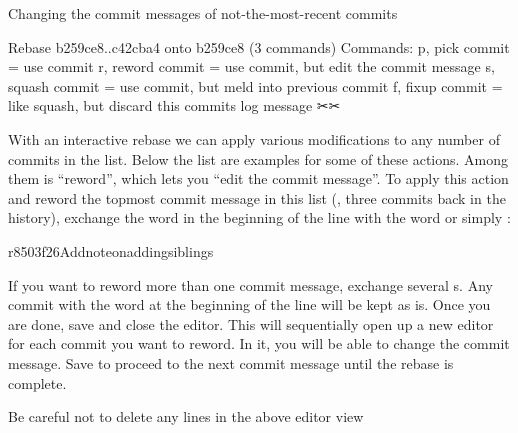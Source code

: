 \begin{findoutmore}[label={fom-rebase1}, before title={\thetcbcounter\ }, float, check odd page=true]{Changing the commit messages of not-the-most-recent commits}
\begin{sphinxVerbatim}[commandchars=\\\{\}]
\PYGZsh{} Rebase b259ce8..c42cba4 onto b259ce8 (3 commands)
\PYGZsh{}
\PYGZsh{} Commands:
\PYGZsh{} p, pick \PYGZlt{}commit\PYGZgt{} = use commit
\PYGZsh{} r, reword \PYGZlt{}commit\PYGZgt{} = use commit, but edit the commit message
\PYGZsh{} s, squash \PYGZlt{}commit\PYGZgt{} = use commit, but meld into previous commit
\PYGZsh{} f, fixup \PYGZlt{}commit\PYGZgt{} = like \PYGZdq{}squash\PYGZdq{}, but discard this commit\PYGZsq{}s log message
\PYGZhy{}✂\PYGZhy{}\PYGZhy{}✂\PYGZhy{}
\end{sphinxVerbatim}

\sphinxAtStartPar
With an interactive rebase we can apply various modifications to any
number of commits in the list. Below the list are examples for some of these
actions. Among them is “reword”, which lets you “edit the commit
message”. To apply this action and reword the top\sphinxhyphen{}most commit message in this list
(, three commits back in the history),
exchange the word  in the beginning of the line with the word
 or simply :

\begin{sphinxVerbatim}[commandchars=\\\{\}]
r8503f26Addnoteonaddingsiblings
\end{sphinxVerbatim}

\sphinxAtStartPar
If you want to reword more than one commit message, exchange several
s. Any commit with the word  at the beginning of the line will
be kept as is. Once you are done, save and close the editor. This will
sequentially open up a new editor for each commit you want to reword. In
it, you will be able to change the commit message. Save to proceed to
the next commit message until the rebase is complete.

\sphinxAtStartPar
Be careful not to delete any lines in the above editor view \textendash{}


\end{findoutmore}

\ignorespaces 

